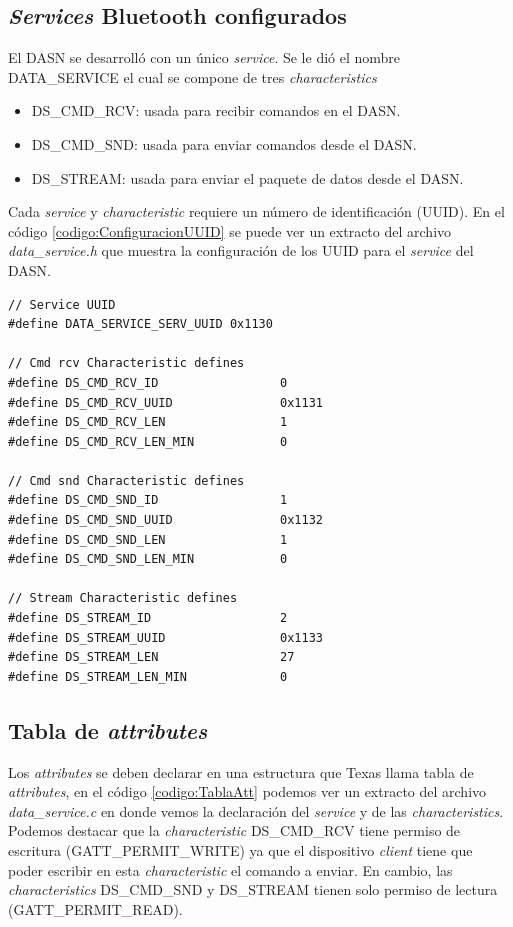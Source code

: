 \subsection{\textit{Services} Bluetooth configurados}
El DASN se desarrolló con un único \textit{service}. Se le dió el nombre DATA\_SERVICE el cual se compone de tres \textit{characteristics} 
\begin{itemize}
\item DS\_CMD\_RCV: usada para recibir comandos en el DASN.
\item DS\_CMD\_SND: usada para enviar comandos desde el DASN.
\item DS\_STREAM: usada para enviar el paquete de datos desde el DASN.
\end{itemize}

Cada \textit{service} y \textit{characteristic} requiere un número de identificación (UUID). En el código \ref{codigo:ConfiguracionUUID} se puede ver un extracto del archivo \textit{data\_service.h} que muestra la configuración de los UUID para el \textit{service} del DASN.

\begin{lstlisting}[caption= Configuración UUID , firstnumber=65 , label=codigo:ConfiguracionUUID]	
// Service UUID
#define DATA_SERVICE_SERV_UUID 0x1130

// Cmd rcv Characteristic defines
#define DS_CMD_RCV_ID                 0
#define DS_CMD_RCV_UUID               0x1131
#define DS_CMD_RCV_LEN                1
#define DS_CMD_RCV_LEN_MIN            0

// Cmd snd Characteristic defines
#define DS_CMD_SND_ID                 1
#define DS_CMD_SND_UUID               0x1132
#define DS_CMD_SND_LEN                1
#define DS_CMD_SND_LEN_MIN            0

// Stream Characteristic defines
#define DS_STREAM_ID                  2
#define DS_STREAM_UUID                0x1133
#define DS_STREAM_LEN                 27
#define DS_STREAM_LEN_MIN             0
\end{lstlisting}

\subsection{Tabla de \textit{attributes}}

Los \textit{attributes} se deben declarar en una estructura que Texas llama tabla de \textit{attributes}, en el código \ref{codigo:TablaAtt} podemos ver un extracto del archivo \textit{data\_service.c} en donde vemos la declaración del \textit{service} y de las \textit{characteristics}. Podemos destacar que la \textit{characteristic} DS\_CMD\_RCV tiene permiso de escritura (GATT\_PERMIT\_WRITE) ya que el dispositivo \textit{client} tiene que poder escribir en esta \textit{characteristic} el comando a enviar. En cambio, las \textit{characteristics} DS\_CMD\_SND y DS\_STREAM tienen solo permiso de lectura (GATT\_PERMIT\_READ).

